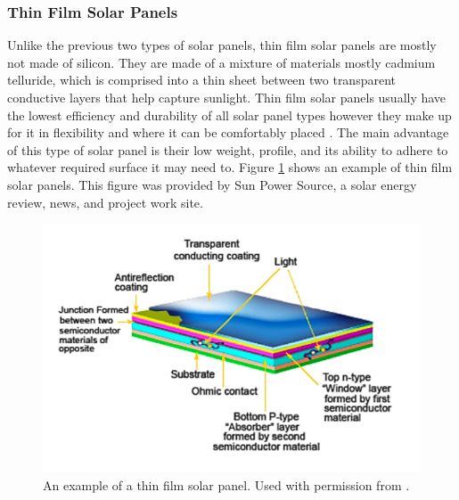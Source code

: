 \subsubsection{Thin Film Solar Panels}
Unlike the previous two types of solar panels, thin film solar panels are mostly not made of silicon. They are made of a mixture of materials mostly cadmium telluride, which is comprised into a thin sheet between two transparent conductive layers that help capture sunlight. Thin film solar panels usually have the lowest efficiency and durability of all solar panel types however they make up for it in flexibility and where it can be comfortably placed . The main advantage of this type of solar panel is their low weight, profile, and its ability to adhere to whatever required surface it may need to. Figure \ref{fig:thin-film-sp} shows an example of thin film solar panels. This figure was provided by Sun Power Source, a solar energy review, news, and project work site.
\cite{Thin-Film-Solar-Cell}
\begin{figure}
    \centering
    \includegraphics[scale=0.4]{figures/thin film solar.png}
    \caption{An example of a thin film solar panel. Used with permission from \cite{solar-thin-ref}.}
    \label{fig:thin-film-sp} 
\end{figure}


